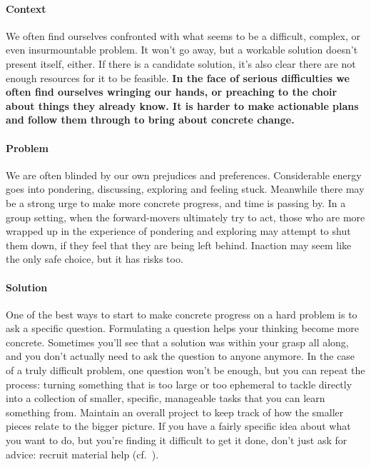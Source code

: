\begin{refsection}
\paragraph{Context}
We often find ourselves confronted with what seems to be a difficult, complex, or even insurmountable problem.  It won't go away, but a workable solution doesn't present itself, either.  If there is a candidate solution, it's also clear there are not enough resources for it to be feasible.
\textbf{In the face of serious difficulties we often find ourselves wringing our hands, or preaching to the choir about things they already know.  It is harder to make actionable plans and follow them through to bring about concrete change.}

\paragraph{Problem}
We are often blinded by our own prejudices and preferences.  Considerable energy goes into pondering, discussing, exploring and feeling stuck.  Meanwhile there may be a strong urge to make more concrete progress, and time is passing by.  In a group setting, when the forward-movers ultimately try to act, those who are more wrapped up in the experience of pondering and exploring may attempt to shut them down, if they feel that they are being left behind.  Inaction may seem like the only safe choice, but it has risks too.

\paragraph{Solution} 
One of the best ways to start to make concrete progress on a hard problem is to ask a specific question.   Formulating a question helps your thinking become more concrete.  Sometimes you'll see that a solution was within your grasp all along, and you don't actually need to ask the question to anyone anymore.  In the case of a truly difficult problem, one question won't be enough, but you can repeat the process: turning something that is too large or too ephemeral to tackle directly into a collection of smaller, specific, manageable tasks that you can learn something from. Maintain an overall project  to keep track of how the smaller pieces relate to the bigger picture.  If you have a fairly specific idea about what you want to do, but you're finding it difficult to get it done, don't just ask for advice: recruit material help (cf.~).


\end{refsection}

